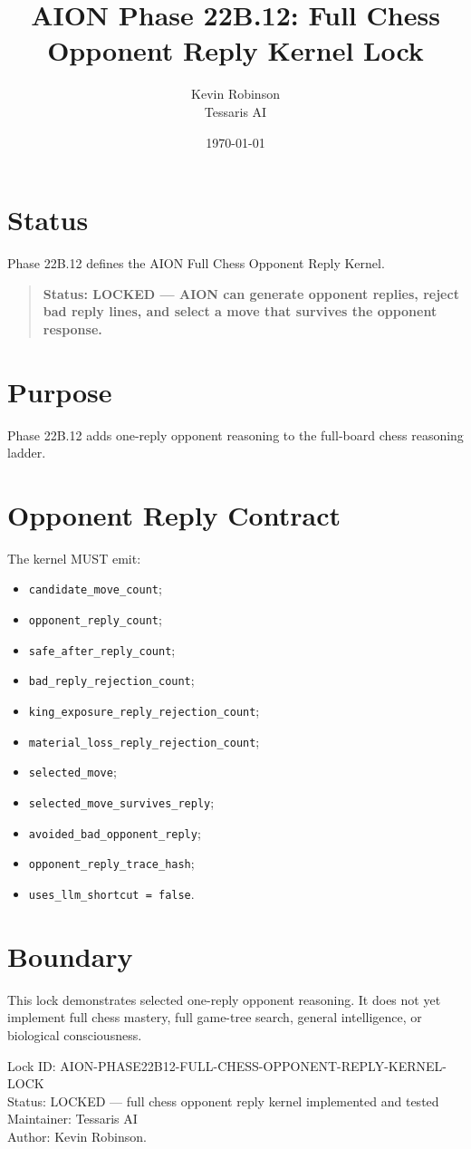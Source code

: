 \documentclass[11pt,a4paper]{article}
\title{\textbf{AION Phase 22B.12: Full Chess Opponent Reply Kernel Lock}}
\author{Kevin Robinson\\Tessaris AI}
\date{\today}
\begin{document}
\maketitle

\section{Status}

Phase 22B.12 defines the AION Full Chess Opponent Reply Kernel.

\begin{quote}
\textbf{Status: LOCKED --- AION can generate opponent replies, reject bad reply lines, and select a move that survives the opponent response.}
\end{quote}

\section{Purpose}

Phase 22B.12 adds one-reply opponent reasoning to the full-board chess reasoning ladder.

\section{Opponent Reply Contract}

The kernel MUST emit:

\begin{itemize}
  \item \texttt{candidate\_move\_count};
  \item \texttt{opponent\_reply\_count};
  \item \texttt{safe\_after\_reply\_count};
  \item \texttt{bad\_reply\_rejection\_count};
  \item \texttt{king\_exposure\_reply\_rejection\_count};
  \item \texttt{material\_loss\_reply\_rejection\_count};
  \item \texttt{selected\_move};
  \item \texttt{selected\_move\_survives\_reply};
  \item \texttt{avoided\_bad\_opponent\_reply};
  \item \texttt{opponent\_reply\_trace\_hash};
  \item \texttt{uses\_llm\_shortcut = false}.
\end{itemize}

\section{Boundary}

This lock demonstrates selected one-reply opponent reasoning. It does not yet implement full chess mastery, full game-tree search, general intelligence, or biological consciousness.

\bigskip

\noindent
Lock ID: AION-PHASE22B12-FULL-CHESS-OPPONENT-REPLY-KERNEL-LOCK\\
Status: LOCKED --- full chess opponent reply kernel implemented and tested\\
Maintainer: Tessaris AI\\
Author: Kevin Robinson.
\end{document}
